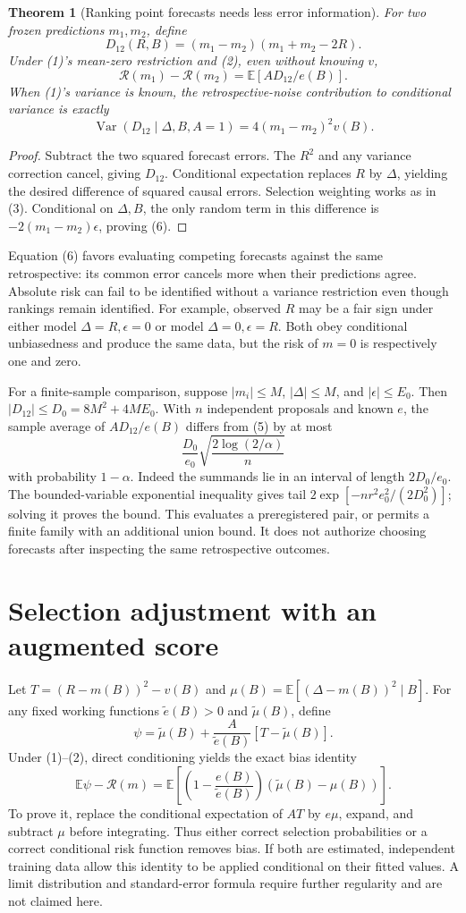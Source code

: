 \documentclass[11pt,a4paper]{article}
\newtheorem{theorem}{Theorem}[section]
\theoremstyle{remark}
\newcommand{\E}{\mathbb E}
\DeclareMathOperator{\Var}{Var}
\begin{document}
\begin{theorem}[Ranking point forecasts needs less error information]
For two frozen predictions $m_1,m_2$, define
\[
 D_{12}(R,B)=(m_1-m_2)(m_1+m_2-2R).
\]
Under (1)'s mean-zero restriction and (2), even without knowing $v$,
\[
 \mathcal R(m_1)-\mathcal R(m_2)
 =\E[A D_{12}/e(B)]. \tag{5}
\]
When (1)'s variance is known, the retrospective-noise contribution to conditional variance is exactly
\[
 \Var(D_{12}\mid\Delta,B,A=1)=4(m_1-m_2)^2v(B). \tag{6}
\]
\end{theorem}
\begin{proof}
Subtract the two squared forecast errors. The $R^2$ and any variance correction cancel, giving $D_{12}$. Conditional expectation replaces $R$ by $\Delta$, yielding the desired difference of squared causal errors. Selection weighting works as in (3). Conditional on $\Delta,B$, the only random term in this difference is $-2(m_1-m_2)\epsilon$, proving (6).
\end{proof}
Equation (6) favors evaluating competing forecasts against the same retrospective: its common error cancels more when their predictions agree. Absolute risk can fail to be identified without a variance restriction even though rankings remain identified. For example, observed $R$ may be a fair sign under either model $\Delta=R,\epsilon=0$ or model $\Delta=0,\epsilon=R$. Both obey conditional unbiasedness and produce the same data, but the risk of $m=0$ is respectively one and zero.

For a finite-sample comparison, suppose $|m_i|\le M$, $|\Delta|\le M$, and $|\epsilon|\le E_0$. Then
$|D_{12}|\le D_0=8M^2+4ME_0$.
With $n$ independent proposals and known $e$, the sample average of $A D_{12}/e(B)$ differs from (5) by at most
\[
 \frac{D_0}{e_0}\sqrt{\frac{2\log(2/\alpha)}n}
\]
with probability $1-\alpha$. Indeed the summands lie in an interval of length $2D_0/e_0$. The bounded-variable exponential inequality gives tail $2\exp[-n r^2e_0^2/(2D_0^2)]$; solving it proves the bound. This evaluates a preregistered pair, or permits a finite family with an additional union bound. It does not authorize choosing forecasts after inspecting the same retrospective outcomes.

\section{Selection adjustment with an augmented score}
Let $T=(R-m(B))^2-v(B)$ and $\mu(B)=\E[(\Delta-m(B))^2\mid B]$. For any fixed working functions $\widetilde e(B)>0$ and $\widetilde\mu(B)$, define
\[
 \psi=\widetilde\mu(B)+\frac A{\widetilde e(B)}[T-\widetilde\mu(B)].
\]
Under (1)--(2), direct conditioning yields the exact bias identity
\[
 \E\psi-\mathcal R(m)=
 \E\left[\left(1-\frac{e(B)}{\widetilde e(B)}\right)
 (\widetilde\mu(B)-\mu(B))\right]. \tag{7}
\]
To prove it, replace the conditional expectation of $AT$ by $e\mu$, expand, and subtract $\mu$ before integrating. Thus either correct selection probabilities or a correct conditional risk function removes bias. If both are estimated, independent training data allow this identity to be applied conditional on their fitted values. A limit distribution and standard-error formula require further regularity and are not claimed here.
\end{document}
